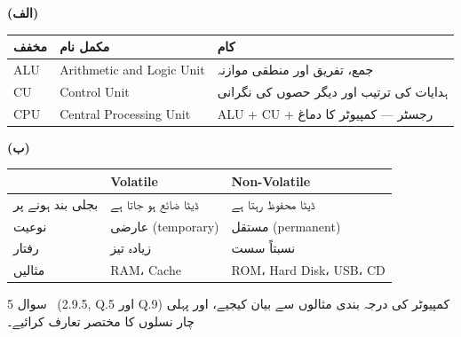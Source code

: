 \begin{hal}
\textbf{(الف)}
\begin{center}
\begin{tabular}{@{}p{2.2cm} p{5.6cm} p{6.2cm}@{}}
\toprule
\textbf{مخفف} & \textbf{مکمل نام} & \textbf{کام} \\
\midrule
\textenglish{ALU} & \textenglish{Arithmetic and Logic Unit} & جمع، تفریق اور منطقی موازنہ \\
\textenglish{CU}  & \textenglish{Control Unit} & ہدایات کی ترتیب اور دیگر حصوں کی نگرانی \\
\textenglish{CPU} & \textenglish{Central Processing Unit} & \textenglish{ALU + CU +} رجسٹر --- کمپیوٹر کا دماغ \\
\bottomrule
\end{tabular}
\end{center}

\textbf{(ب)}
\begin{center}
\begin{tabular}{@{}p{3.0cm} p{5.6cm} p{5.4cm}@{}}
\toprule
 & \textbf{\textenglish{Volatile}} & \textbf{\textenglish{Non-Volatile}} \\
\midrule
بجلی بند ہونے پر & ڈیٹا ضائع ہو جاتا ہے & ڈیٹا محفوظ رہتا ہے \\
نوعیت & عارضی (\textenglish{temporary}) & مستقل (\textenglish{permanent}) \\
رفتار & زیادہ تیز & نسبتاً سست \\
مثالیں & \textenglish{RAM}، \textenglish{Cache} & \textenglish{ROM}، \textenglish{Hard Disk}، \textenglish{USB}، \textenglish{CD} \\
\bottomrule
\end{tabular}
\end{center}

\end{hal}

\begin{sawal}{سوال \textenglish{5} \ \textnormal{\small(\textenglish{2.9.5, Q.5} اور \textenglish{Q.9})}}
کمپیوٹر کی درجہ بندی مثالوں سے بیان کیجیے، اور پہلی چار نسلوں کا مختصر تعارف
کرائیے۔
\end{sawal}

